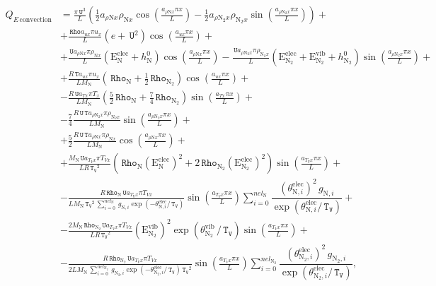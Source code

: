 \documentclass[10pt]{article}
\newcommand{\Rho}{\,\mathtt{Rho}}
\newcommand{\T}{\,\mathtt{T}}
\newcommand{\U}{\,\mathtt{U}}
\newcommand{\TV}{\,\mathtt{T_V}}
\newcommand{\N}{\text{N}}
\newcommand{\elec}{\text{elec}}
\newcommand{\vib}{\text{vib}}
\newcommand{\E}{\text{E}}
\newcommand{\convection}{\,\text{convection}}
\newcommand{\eelecNden}{\,\sum_{i=0}^{nel_{\N}}   \, g_{\N,i}   \exp \left( -\theta^{\elec}_{\N,i} / \TV  \right) }
\newcommand{\eelecNdoisden}{\,\sum_{i=0}^{nel_{\N_2}}  \, g_{\N_2,i}   \exp \left( -\theta^{\elec}_{\N_2,i} /  \TV \right)}
\begin{document}
\begin{equation*}
\begin{split}
%
%
 Q_{E \convection} &= 
\frac{\pi \U^{3} }{L} \left(\frac{1}{2} a_{ \rho \N x} \rho_{\N x} \cos\left(\frac{a_{ \rho \N x} \pi x}{L}\right) - \frac{1}{2}
a_{ \rho \N_2 x} \rho_{\N_2 x} \sin\left(\frac{a_{ \rho \N_2 x} \pi x}{L}\right)\right)+\\
%
&+ \frac{ \Rho a_{ux} \pi u_{x} }{L}\left(e + \U^{2}\right) \cos\left(\frac{a_{ux} \pi x}{L}\right) +\\
%
& + \frac{\U a_{ \rho \N x} \pi \rho_{\N x} }{L} \left(\E^{\elec}_{\N} + h^0_{\N}\right) \cos\left(\frac{a_{ \rho \N x} \pi
x}{L}\right)- \frac{\U a_{ \rho \N_2 x} \pi \rho_{\N_2 x} }{L}\left(\E^{\elec}_{\N_2} + \E^{\vib}_{\N_2} + h^0_{\N_2}\right)
\sin\left(\frac{a_{ \rho \N_2 x} \pi x}{L}\right) +\\
%
&+ \frac{R \T a_{ux} \pi u_{x} }{L M_{\N}}\left(\Rho_{\N} + \frac{1}{2} \Rho_{\N_2}\right) \cos\left(\frac{a_{ux} \pi
x}{L}\right)+\\
%
& - \frac{ R \U a_{Tx} \pi T_{x} }{L M_{\N}}\left(\frac{5}{2} \Rho_{\N} + \frac{7}{4} \Rho_{\N_2}\right) \sin\left(\frac{a_{Tx}
\pi x}{L}\right)+\\
%
& - \frac{7}{4} \frac{R \U \T a_{ \rho \N_2 x} \pi \rho_{\N_2 x} }{L M_{\N}}\sin\left(\frac{a_{ \rho \N_2 x} \pi x}{L}\right)+\\
%
& + \frac{5}{2} \frac{R \U \T a_{ \rho \N x} \pi \rho_{\N x} }{L M_{\N}}\cos\left(\frac{a_{ \rho \N x} \pi x}{L}\right)+\\
%
& + \frac{M_{\N} \U a_{T_V x} \pi T_{Vx}}{L R \TV^{2}}\left(\Rho_{\N} \left( \E^{\elec}_{\N} \right)^2 + 2 \Rho_{\N_2} \left(
\E^{\elec}_{\N_2} \right)^2 \right) \sin\left(\frac{a_{T_V x} \pi x}{L}\right) +\\ 
%
& - \frac{ R \Rho_{\N} \U a_{T_V x} \pi T_{Vx} }{L M_{\N} \TV^{2} \eelecNden}\sin\left(\frac{a_{T_V x} \pi x}{L}\right)
\sum_{i=0}^{nel_{\N}} \dfrac{ \left( \theta^{\elec}_{\N,i} \right)^2   \, g_{\N,i} }{ \exp \left( \theta^{\elec}_{\N,i} / \TV
\right)}+\\
%
& - \frac{2 M_{\N} \Rho_{\N_2}\U a_{T_V x} \pi T_{Vx} }{L R \TV^{2}}\left( \E^{\vib}_{\N_2} \right)^2 \exp\left(
\theta^{\vib}_{\N_2} \, / \TV \right) \sin\left(\frac{a_{T_V x} \pi x}{L}\right) +\\ 
%
& - \frac{R \Rho_{\N_2}\U a_{T_V x} \pi T_{Vx} }{2 L M_{\N} \eelecNdoisden \TV^{2}}\sin\left(\frac{a_{T_V x} \pi x}{L}\right) 
\sum_{i=0}^{nel_{\N_2}} \dfrac{ \left( \theta^{\elec}_{\N_2,i} \right)^2   \, g_{\N_2,i} }{ \exp \left( \theta^{\elec}_{\N_2,i} / 
\TV \right)},\\
%
%
%
\end{split}
\end{equation*}
\end{document}

